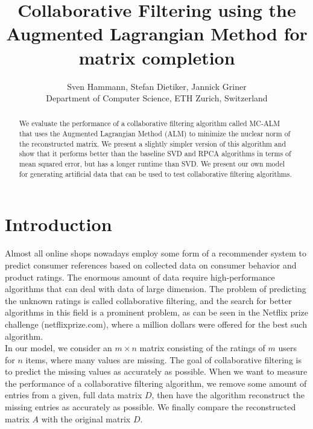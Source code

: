 \documentclass[10pt,conference,compsocconf]{IEEEtran}
\begin{document}
\title{Collaborative Filtering using the Augmented Lagrangian Method for matrix completion}

\author{
  Sven Hammann, Stefan Dietiker, Jannick Griner\\
  Department of Computer Science, ETH Zurich, Switzerland
}



\maketitle

\begin{abstract}
We evaluate the performance of a collaborative filtering algorithm called MC-ALM that uses the
Augmented Lagrangian Method (ALM) to minimize the nuclear norm of the reconstructed matrix.
We present a slightly simpler version of this algorithm and show that it performs better than the baseline
SVD and RPCA algorithms in terms of mean squared error, but has a longer runtime than SVD. We present our own 
model for generating artificial data that can be used to test collaborative filtering algorithms.
\end{abstract}

\section{Introduction}
Almost all online shops nowadays employ some form of a recommender system to predict consumer references based on collected data on consumer behavior and product ratings. The enormous amount of data require high-performance algorithms that can deal with data of large dimension. The problem of predicting the unknown ratings is called collaborative filtering, and the search for better algorithms in this field is a prominent problem, as can be seen in the Netflix prize challenge (netflixprize.com), where a million dollars were offered for the best such algorithm. \\

In our model, we consider an $m \times n$ matrix consisting of the ratings of $m$ users for $n$ items,
where many values are missing. The goal of collaborative filtering is to predict the missing values as accurately as possible. 
When we want to measure the performance of a collaborative filtering algorithm, we remove some amount of entries from a given, full data matrix $D$, then have the algorithm reconstruct the missing entries as accurately as possible. We finally compare the reconstructed matrix $A$ with the original matrix $D$. \\
\end{document}
